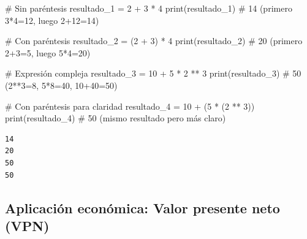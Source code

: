 \documentclass[
  doc,
  floatsintext,
  longtable,
  a4paper,
  nolmodern,
  notxfonts,
  notimes,
  12pt,
  colorlinks=true,linkcolor=blue,citecolor=blue,urlcolor=blue]{apa7}
\newenvironment{Shaded}{\begin{snugshade}}{\end{snugshade}}
\newcommand{\BuiltInTok}[1]{\textcolor[rgb]{0.00,0.23,0.31}{#1}}
\newcommand{\CommentTok}[1]{\textcolor[rgb]{0.37,0.37,0.37}{#1}}
\newcommand{\DecValTok}[1]{\textcolor[rgb]{0.68,0.00,0.00}{#1}}
\newcommand{\NormalTok}[1]{\textcolor[rgb]{0.00,0.23,0.31}{#1}}
\newcommand{\OperatorTok}[1]{\textcolor[rgb]{0.37,0.37,0.37}{#1}}
\begin{document}
\begin{Shaded}
\begin{Highlighting}[]
\CommentTok{\# Sin paréntesis}
\NormalTok{resultado\_1 }\OperatorTok{=} \DecValTok{2} \OperatorTok{+} \DecValTok{3} \OperatorTok{*} \DecValTok{4}
\BuiltInTok{print}\NormalTok{(resultado\_1)  }\CommentTok{\# 14 (primero 3*4=12, luego 2+12=14)}

\CommentTok{\# Con paréntesis}
\NormalTok{resultado\_2 }\OperatorTok{=}\NormalTok{ (}\DecValTok{2} \OperatorTok{+} \DecValTok{3}\NormalTok{) }\OperatorTok{*} \DecValTok{4}
\BuiltInTok{print}\NormalTok{(resultado\_2)  }\CommentTok{\# 20 (primero 2+3=5, luego 5*4=20)}

\CommentTok{\# Expresión compleja}
\NormalTok{resultado\_3 }\OperatorTok{=} \DecValTok{10} \OperatorTok{+} \DecValTok{5} \OperatorTok{*} \DecValTok{2} \OperatorTok{**} \DecValTok{3}
\BuiltInTok{print}\NormalTok{(resultado\_3)  }\CommentTok{\# 50 (2**3=8, 5*8=40, 10+40=50)}

\CommentTok{\# Con paréntesis para claridad}
\NormalTok{resultado\_4 }\OperatorTok{=} \DecValTok{10} \OperatorTok{+}\NormalTok{ (}\DecValTok{5} \OperatorTok{*}\NormalTok{ (}\DecValTok{2} \OperatorTok{**} \DecValTok{3}\NormalTok{))}
\BuiltInTok{print}\NormalTok{(resultado\_4)  }\CommentTok{\# 50 (mismo resultado pero más claro)}
\end{Highlighting}
\end{Shaded}

\begin{verbatim}
14
20
50
50
\end{verbatim}

\subsection{Aplicación económica: Valor presente neto
(VPN)}\label{aplicaciuxf3n-econuxf3mica-valor-presente-neto-vpn}
\end{document}
